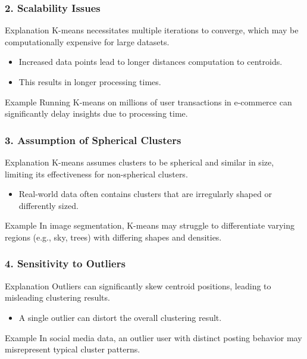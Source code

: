 \documentclass[aspectratio=169]{beamer}
\begin{document}
\begin{frame}[fragile]
    \frametitle{2. Scalability Issues}
    \begin{block}{Explanation}
        K-means necessitates multiple iterations to converge, which may be computationally expensive for large datasets.
    \end{block}
    \begin{itemize}
        \item Increased data points lead to longer distances computation to centroids.
        \item This results in longer processing times.
    \end{itemize}
    \begin{block}{Example}
        Running K-means on millions of user transactions in e-commerce can significantly delay insights due to processing time.
    \end{block}
\end{frame}

\begin{frame}[fragile]
    \frametitle{3. Assumption of Spherical Clusters}
    \begin{block}{Explanation}
        K-means assumes clusters to be spherical and similar in size, limiting its effectiveness for non-spherical clusters.
    \end{block}
    \begin{itemize}
        \item Real-world data often contains clusters that are irregularly shaped or differently sized.
    \end{itemize}
    \begin{block}{Example}
        In image segmentation, K-means may struggle to differentiate varying regions (e.g., sky, trees) with differing shapes and densities.
    \end{block}
\end{frame}

\begin{frame}[fragile]
    \frametitle{4. Sensitivity to Outliers}
    \begin{block}{Explanation}
        Outliers can significantly skew centroid positions, leading to misleading clustering results.
    \end{block}
    \begin{itemize}
        \item A single outlier can distort the overall clustering result.
    \end{itemize}
    \begin{block}{Example}
        In social media data, an outlier user with distinct posting behavior may misrepresent typical cluster patterns.
    \end{block}
\end{frame}
\end{document}
